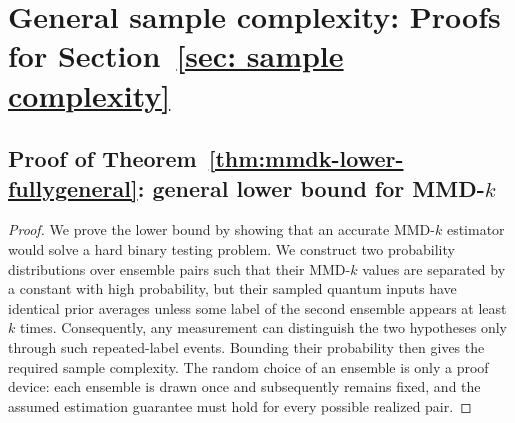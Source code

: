 \documentclass[aps,prx,reprint,superscriptaddress,amsmath,amssymb,longbibliography,floatfix]{revtex4-2}
\theoremstyle{plain}
\theoremstyle{definition}
\theoremstyle{remark}
\begin{document}
\section{General sample complexity: Proofs for Section~\ref{sec: sample complexity}
}

\subsection{Proof of Theorem~\ref{thm:mmdk-lower-fullygeneral}: general lower bound for MMD-$k$}
\label{app: proof lower general}

\begin{proof}
We prove the lower bound by showing that an accurate MMD-$k$ estimator would solve a hard binary testing problem. We construct two probability distributions over ensemble pairs such that their MMD-$k$ values are separated by a constant with high probability, but their sampled quantum inputs have identical prior averages unless some label of the second ensemble appears at least $k$ times. Consequently, any measurement can distinguish the two hypotheses only through such repeated-label events. Bounding their probability then gives the required sample complexity. The random choice of an ensemble is only a proof device: each ensemble is drawn once and subsequently remains fixed, and the assumed estimation guarantee must hold for every possible realized pair.


\end{proof}
\end{document}
